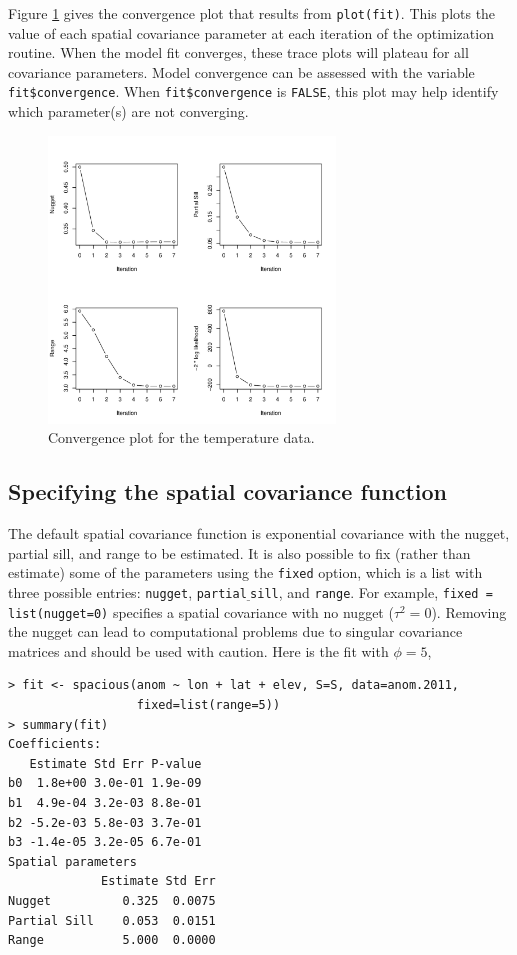 \documentclass[11pt]{article}
\begin{document}
Figure \ref{f:converge} gives the convergence plot that results from {\tt plot(fit)}.
This plots the value of each spatial covariance parameter at each iteration of the optimization routine.
When the model fit converges, these trace plots will plateau for all covariance parameters.
Model convergence can be assessed with the variable {\tt fit\$convergence}.
When {\tt fit\$convergence} is {\tt FALSE}, this plot may help identify which parameter(s) are not converging.

\begin{figure}
	\caption{Convergence plot for the temperature data.}\label{f:converge}
	\centering
	\includegraphics[width=3in]{figures/converge.pdf}
\end{figure}

\subsection{Specifying the spatial covariance function}
The default spatial covariance function is exponential covariance with the nugget, partial sill, and range to be estimated.
It is also possible to fix (rather than estimate) some of the parameters using the {\tt fixed} option, which is a list with three possible entries: {\tt nugget}, {\tt partial$\underline{\ }$sill}, and {\tt range}.
For example, {\tt fixed = list(nugget=0)} specifies a spatial covariance with no nugget ($\tau^2=0$).
Removing the nugget can lead to computational problems due to singular covariance matrices and should be used with caution.
Here is the fit with $\phi=5$,

\begin{verbatim}
> fit <- spacious(anom ~ lon + lat + elev, S=S, data=anom.2011,
                  fixed=list(range=5))
> summary(fit)
Coefficients:
   Estimate Std Err P-value
b0  1.8e+00 3.0e-01 1.9e-09
b1  4.9e-04 3.2e-03 8.8e-01
b2 -5.2e-03 5.8e-03 3.7e-01
b3 -1.4e-05 3.2e-05 6.7e-01
Spatial parameters
             Estimate Std Err
Nugget          0.325  0.0075
Partial Sill    0.053  0.0151
Range           5.000  0.0000
\end{verbatim}
\end{document}
